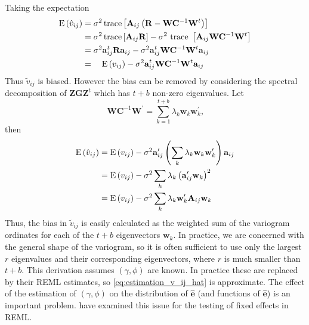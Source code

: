 Taking the expectation
\begin{equation}
    \begin{aligned}
        \mathrm{E}\left(\Hat{v}_{i j}\right) 
        & = \sigma^{2} \operatorname{trace}\left[\mathbf{A}_{i j}\left(\mathbf{R} - \mathbf{W} \mathbf{C}^{-1} \mathbf{W}^{t}\right)\right]   \\
        & = \sigma^{2} \operatorname{trace}\left[\mathbf{A}_{i j} \mathbf{R}\right]-\sigma^{2} \text { trace }\left[\mathbf{A}_{i j} \mathbf{W} \mathbf{C}^{-1} \mathbf{W}^{t}\right] \\
        & =\sigma^{2} \mathbf{a}_{i j}^{t} \mathbf{R} \mathbf{a}_{i j}-\sigma^{2} \mathbf{a}_{i j}^{t} \mathbf{W} \mathbf{C}^{-1} \mathbf{W}^{t} \mathbf{a}_{i j} \\
        & =\quad \mathrm{E}\left(v_{i j}\right)-\sigma^{2} \mathbf{a}_{i j}^{t} \mathbf{W} \mathbf{C}^{-1} \mathbf{W}^{t} \mathbf{a}_{i j}
    \end{aligned}
\end{equation}
Thus $\tilde{v}_{ij}$ is biased. However the bias can be removed by considering the spectral decomposition of $\mathbf{Z}\boldsymbol{G} \mathbf{Z}^{t}$ which has $t+b$ non-zero eigenvalues. Let
\begin{equation}
    \mathbf{W C}^{-1} \mathbf{W}^{\prime}=\sum_{k=1}^{t+b} \lambda_{k} \mathbf{w}_{k} \mathbf{w}_{k}^{\prime}
    \text{,}
\end{equation}
then
\begin{equation}
    \begin{aligned}
        \mathrm{E}\left(\Hat{v}_{i j}\right)
        & =\mathrm{E}\left(v_{i j}\right)-\sigma^{2} \mathbf{a}_{i j}^{\prime}\left(\sum_{k} \lambda_{k} \mathbf{w}_{k} \mathbf{w}_{k}^{\prime}\right) \mathbf{a}_{i j} \\
        & = \mathrm{E}\left(v_{i j}\right)-\sigma^{2} \sum_{h} \lambda_{k}\left(\mathbf{a}_{i j}^{\prime} \mathbf{w}_{k}\right)^{2} \\
        & = \mathrm{E}\left(v_{i j}\right)-\sigma^{2} \sum_{k} \lambda_{k} \mathbf{w}_{k}^{\prime} \mathbf{A}_{i j} \mathbf{w}_{k}
    \end{aligned}
    \label{eq:estimation_v_ij_hat}
\end{equation}
Thus, the bias in  $\tilde{v}_{ij}$ is easily calculated as the weighted sum of the variogram ordinates for each of the $t + b$ eigenvectors $\mathbf{w}_k$. In practice, we are concerned with the general shape of the variogram, so it is often sufficient to use only the largest $r$ eigenvalues and their corresponding eigenvectors, where $r$ is much smaller than $t + b$. This derivation assumes $(\gamma,\phi)$ are known. In practice these are replaced by their REML estimates, so \ref{eq:estimation_v_ij_hat} is approximate. The effect of the estimation of $(\gamma,\phi)$ on the distribution of $\hat{\mathbf{e}}$ (and functions of $\hat{\mathbf{e}}$) is an important problem. \textcite{kenward1997precision} have examined this issue for the testing of fixed effects in REML.

